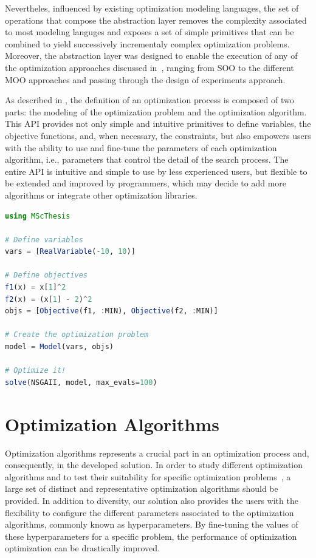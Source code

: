 Nevertheles, influenced by existing optimization modeling languages, the set of operations that compose the abstraction layer removes the complexity associated to most modeling languges and exposes a set of simple primitives that can be combined to yield successively incrementaly complex optimization problems. Moreover, the abstraction layer was designed to enable the execution of any of the optimization approaches discussed in~, ranging from \ac{SOO} to the different \ac{MOO} approaches and passing through the design of experiments approach. 

As described in , the definition of an optimization process is composed of two parts: the modeling of the optimization problem and the optimization algorithm. This \ac{API} provides not only simple and intuitive primitives to define variables, the objective functions, and, when necessary, the constraints, but also empowers users with the ability to use and fine-tune the parameters of each optimization algorithm, i.e., parameters that control the detail of the search process. The entire \ac{API} is intuitive and simple to use by less experienced users, but flexible to be extended and improved by programmers, which may decide to add more algorithms or integrate other optimization libraries.


\begin{lstlisting}[language=julia,caption={\mcode{Simple example of the optimizer prototype's \ac{API} in Julia.}}]
using MScThesis

# Define variables
vars = [RealVariable(-10, 10)]

# Define objectives
f1(x) = x[1]^2
f2(x) = (x[1] - 2)^2
objs = [Objective(f1, :MIN), Objective(f2, :MIN)]

# Create the optimization problem
model = Model(vars, objs)

# Optimize it!
solve(NSGAII, model, max_evals=100)
\end{lstlisting}

\section{Optimization Algorithms}
\label{sec:optalgos}

Optimization algorithms represents a crucial part in an optimization process and, consequently, in the developed solution. In order to study different optimization algorithms and to test their suitability for specific optimization problems~\cite{Wolpert1997NFLT}, a large set of distinct and representative optimization algorithms should be provided. In addition to diversity, our solution also provides the users with the flexibility to configure the different parameters associated to the optimization algorithms, commonly known as hyperparameters. By fine-tuning the values of these hyperparameters for a specific problem, the performance of optimization optimization can be drastically improved. 

